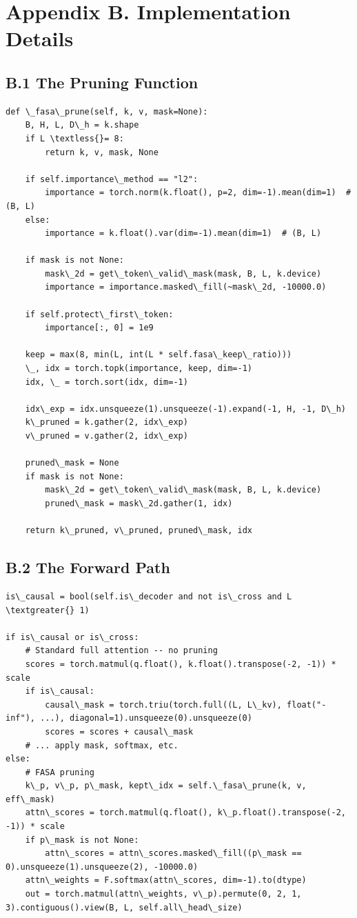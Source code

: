 
\section{Appendix B. Implementation Details}

\subsection{B.1 The Pruning Function}

\begin{lstlisting}
def \_fasa\_prune(self, k, v, mask=None):
    B, H, L, D\_h = k.shape
    if L \textless{}= 8:
        return k, v, mask, None
    
    if self.importance\_method == "l2":
        importance = torch.norm(k.float(), p=2, dim=-1).mean(dim=1)  # (B, L)
    else:
        importance = k.float().var(dim=-1).mean(dim=1)  # (B, L)
    
    if mask is not None:
        mask\_2d = get\_token\_valid\_mask(mask, B, L, k.device)
        importance = importance.masked\_fill(~mask\_2d, -10000.0)
    
    if self.protect\_first\_token:
        importance[:, 0] = 1e9
    
    keep = max(8, min(L, int(L * self.fasa\_keep\_ratio)))
    \_, idx = torch.topk(importance, keep, dim=-1)
    idx, \_ = torch.sort(idx, dim=-1)
    
    idx\_exp = idx.unsqueeze(1).unsqueeze(-1).expand(-1, H, -1, D\_h)
    k\_pruned = k.gather(2, idx\_exp)
    v\_pruned = v.gather(2, idx\_exp)
    
    pruned\_mask = None
    if mask is not None:
        mask\_2d = get\_token\_valid\_mask(mask, B, L, k.device)
        pruned\_mask = mask\_2d.gather(1, idx)
    
    return k\_pruned, v\_pruned, pruned\_mask, idx
\end{lstlisting}

\subsection{B.2 The Forward Path}

\begin{lstlisting}
is\_causal = bool(self.is\_decoder and not is\_cross and L \textgreater{} 1)

if is\_causal or is\_cross:
    # Standard full attention -- no pruning
    scores = torch.matmul(q.float(), k.float().transpose(-2, -1)) * scale
    if is\_causal:
        causal\_mask = torch.triu(torch.full((L, L\_kv), float("-inf"), ...), diagonal=1).unsqueeze(0).unsqueeze(0)
        scores = scores + causal\_mask
    # ... apply mask, softmax, etc.
else:
    # FASA pruning
    k\_p, v\_p, p\_mask, kept\_idx = self.\_fasa\_prune(k, v, eff\_mask)
    attn\_scores = torch.matmul(q.float(), k\_p.float().transpose(-2, -1)) * scale
    if p\_mask is not None:
        attn\_scores = attn\_scores.masked\_fill((p\_mask == 0).unsqueeze(1).unsqueeze(2), -10000.0)
    attn\_weights = F.softmax(attn\_scores, dim=-1).to(dtype)
    out = torch.matmul(attn\_weights, v\_p).permute(0, 2, 1, 3).contiguous().view(B, L, self.all\_head\_size)
\end{lstlisting}

